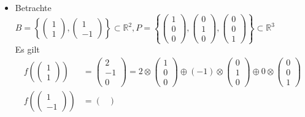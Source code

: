 \documentclass[a5paper, 10pt]{book}
\newcommand{\circleplus}{\oplus}%
\newcommand{\circlecdot}{\otimes}%
\begin{document}
\begin{itemize}
						\item Betrachte $B = \left\{ \begin{pmatrix} 1 \\ 1 \end{pmatrix}, \begin{pmatrix} 1 \\ -1 \end{pmatrix} \right\} \subset \mathbb{R}^2, P = \left\{ \begin{pmatrix} 1 \\ 0 \\ 0 \end{pmatrix}, \begin{pmatrix} 0 \\ 1 \\ 0 \end{pmatrix}, \begin{pmatrix} 0 \\ 0 \\ 1 \end{pmatrix} \right\} \subset \mathbb{R}^3$\\
						Es gilt
						\begin{align}
							f\left( \begin{pmatrix}
							1 \\ 1
							\end{pmatrix}  \right) &= \begin{pmatrix}
							2 \\ -1 \\ 0
							\end{pmatrix} = 2 \circlecdot \begin{pmatrix}
							1 \\ 0 \\ 0
							\end{pmatrix} \circleplus (-1) \circlecdot \begin{pmatrix}
							0 \\ 1 \\ 0
							\end{pmatrix} \circleplus 0 \circlecdot \begin{pmatrix}
							0 \\ 0 \\ 1
							\end{pmatrix}\\
							f\left( \begin{pmatrix}
							1 \\ -1
							\end{pmatrix}  \right) &= \begin{pmatrix}

\end{pmatrix}
\end{align}
\end{itemize}
\end{document}
